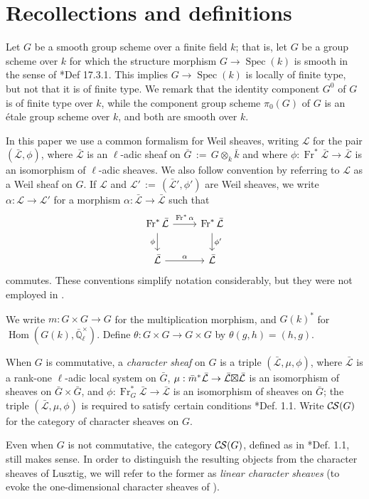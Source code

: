 \documentclass[10pt]{amsart}
\theoremstyle{plain}
\theoremstyle{definition}
\newcommand{\EE}{\mathbb{\bar Q}_\ell}
\newcommand{\bFq}{\bar{k}}
\newcommand{\Fq}{k}
\newcommand{\EEx}{\EE^\times}
\newcommand{\Frob}[1]{\operatorname{Fr}_{#1}}
\DeclareMathOperator{\Hom}{Hom}
\newcommand{\Spec}[1]{{\operatorname{Spec}(#1)}}
\newcommand{\ceq}{{\, :=\, }}
\newcommand{\cs}[1]{{\mathcal{#1}}}
\newcommand{\gcs}[1]{{\mathcal{\bar #1}}}
\newcommand{\CS}{{\mathcal{C\hskip-0.8pt S}}}
\newcommand{\bm}{\bar{m}}
\newcommand{\bG}{\bar{G}}
\newcommand{\tight}[3]{\hspace{-#1pt}{#2}\hspace{-#3pt}}
\newcommand{\LxL}{\text{$\gcs{L} \tight{0}{\boxtimes}{0} \gcs{L}$}}
\begin{document}
\section{Recollections and definitions} \label{sec:defs}

Let $G$ be a smooth group scheme over a finite field $\Fq$; that is, let $G$ be a group scheme over $\Fq$
for which the structure morphism $G \to \Spec{\Fq}$ is smooth in the sense of \cite{EGAIV4}*{Def 17.3.1}.
This implies $G \to \Spec{\Fq}$ is locally of finite type, but not that it is of finite type.
We remark that the identity component $G^0$ of $G$ is of finite type over $\Fq$, while the component group scheme
$\pi_0(G)$ of $G$ is an \'etale group scheme over $\Fq$, and both are smooth over $\Fq$.

In this paper we use a common formalism for Weil sheaves, writing $\cs{L}$ for the pair $(\gcs{L},\phi)$, where $\gcs{L}$ is an $\ell$-adic sheaf on $\bG \ceq G\otimes_{\Fq} \bFq$ and where $\phi : \Frob{}^*\gcs{L} \to \gcs{L}$ is an isomorphism of $\ell$-adic sheaves. 
We also follow convention by referring to $\cs{L}$  as a Weil sheaf on $G$. 
If $\cs{L}$ and $\cs{L}' \ceq (\gcs{L}', \phi')$ are Weil sheaves, we write $\alpha : \cs{L} \to \cs{L}'$ for a morphism $\alpha : \gcs{L} \to \gcs{L}$ such that 
\[
\begin{tikzcd}
\Frob{}^* \gcs{L} \arrow{d}[swap]{\phi} \arrow{r}{\Frob{}^*\alpha} &  \Frob{}^* \gcs{L} \arrow{d}{\phi'}\\
\gcs{L} \arrow{r}{\alpha} & \gcs{L}
\end{tikzcd}
\]
commutes.  
These conventions simplify notation considerably, but they were not employed in \cite{cunningham-roe:13a}.

We write $m : G \times G \to G$ for the multiplication morphism, and $G(k)^*$ for $\Hom(G(k), \EEx)$.
Define $\theta : G\times G \to G\times G$ by $\theta(g,h) = (h,g)$.

When $G$ is commutative, a \emph{character sheaf} on $G$ is a triple $(\gcs{L}, \mu, \phi)$,
where $\gcs{L}$ is a rank-one $\ell$-adic local system on $\bG$, 
$\mu : \bm^* \gcs{L} \to \LxL$ is an isomorphism
of sheaves on $\bG \times \bG$, 
and $\phi : \Frob{G}^* \gcs{L} \to \gcs{L}$ is an isomorphism of sheaves on $\bG$;
the triple $(\gcs{L}, \mu, \phi)$ is required to satisfy certain conditions \cite{cunningham-roe:13a}*{Def. 1.1}.
Write $\CS(G)$ for the category of character sheaves on $G$.

Even when $G$ is not commutative, the category $\CS(G)$, defined as in \cite{cunningham-roe:13a}*{Def. 1.1},
still makes sense.  In order to distinguish the resulting objects from
the character sheaves of Lusztig, we will refer to the former as \emph{linear character sheaves}
(to evoke the one-dimensional character sheaves of \cite{kamgarpour:09a}).
\end{document}
